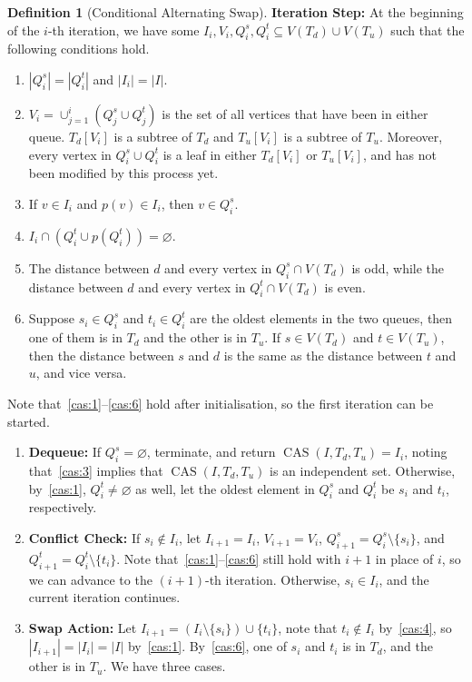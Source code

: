 \documentclass[11pt]{article}
\theoremstyle{definition}
\newtheorem{definition}[theorem]{Definition}
\DeclareMathOperator{\cas}{CAS}
\newcounter{propcounter}
\begin{document}
\begin{definition}[Conditional Alternating Swap]
\noindent\textbf{Iteration Step:}
At the beginning of the $i$-th iteration, we have some $I_i,V_i,Q_i^s,Q_i^t\subseteq V(T_d)\cup V(T_u)$ such that the following conditions hold. 
\begin{enumerate}[label = \textbf{\Alph{propcounter}\arabic{enumi}}]
    \item\label{cas:1} $|Q_i^s|=|Q_i^t|$ and $|I_{i}|=|I|$.
    \item\label{cas:2} $V_i=\cup_{j=1}^i(Q_j^s\cup Q_j^t)$ is the set of all vertices that have been in either queue. $T_d[V_i]$ is a subtree of $T_d$ and $T_u[V_i]$ is a subtree of $T_u$. Moreover, every vertex in $Q_i^s\cup Q_i^t$ is a leaf in either $T_d[V_i]$ or $T_u[V_i]$, and has not been modified by this process yet.
    \item\label{cas:3} If $v\in I_i$ and $p(v)\in I_i$, then $v\in Q_i^s$.
    \item\label{cas:4} $I_i\cap(Q_i^t\cup p(Q_i^t))=\varnothing$.
    \item\label{cas:5} The distance between $d$ and every vertex in $Q_i^s\cap V(T_d)$ is odd, while the distance between $d$ and every vertex in $Q_i^t\cap V(T_d)$ is even.
    \item\label{cas:6} Suppose $s_i\in Q_i^s$ and $t_i\in Q_i^t$ are the oldest elements in the two queues, then one of them is in $T_d$ and the other is in $T_u$. If $s\in V(T_d)$ and $t\in V(T_u)$, then the distance between $s$ and $d$ is the same as the distance between $t$ and $u$, and vice versa. 
\end{enumerate} 
Note that~\ref{cas:1}--\ref{cas:6} hold after initialisation, so the first iteration can be started.
\begin{enumerate}
    \item \textbf{Dequeue:} If $Q_i^s=\varnothing$, terminate, and return $\cas(I,T_d,T_u)=I_i$, noting that~\ref{cas:3} implies that $\cas(I,T_d,T_u)$ is an independent set. Otherwise, by~\ref{cas:1}, $Q_i^t\not=\varnothing$ as well, let the oldest element in $Q_i^s$ and $Q_i^t$ be $s_i$ and $t_i$, respectively.
    \item \textbf{Conflict Check:} If $s_i\notin I_i$, let $I_{i+1}=I_i$, $V_{i+1}=V_i$, $Q_{i+1}^s=Q_i^s\setminus\{s_i\}$, and $Q_{i+1}^t=Q_i^t\setminus\{t_i\}$. Note that~\ref{cas:1}--\ref{cas:6} still hold with $i+1$ in place of $i$, so we can advance to the $(i+1)$-th iteration. Otherwise, $s_i\in I_i$, and the current iteration continues.
    \item \textbf{Swap Action:} Let $I_{i+1}=(I_i\setminus \{s_i\}) \cup \{t_i\}$, note that $t_i\not\in I_i$ by~\ref{cas:4}, so $|I_{i+1}|=|I_i|=|I|$ by~\ref{cas:1}. By~\ref{cas:6}, one of $s_i$ and $t_i$ is in $T_d$, and the other is in $T_u$. We have three cases.

\end{enumerate}
\end{definition}
\end{document}
